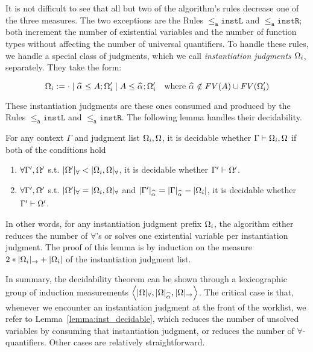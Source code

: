It is not difficult to see that all but two of the algorithm's rules decrease
one of the three measures. The two exceptions are the Rules $\mathtt{{\le_a}instL}$ and $\mathtt{{\le_a}instR}$; both increment the number of existential
variables and the number of function types without affecting the number of
universal quantifiers.
To handle these rules, we handle a special class of judgments, which
we call \emph{instantiation judgments} $\exps_i$, separately. They 
take the form:
\begin{definition}[$\exps_i$]
$$\exps_i := \cdot \mid \jcons{\al\le A}{\exps_i'} \mid \jcons{A\le \al}{\exps_i'}
\quad\text{where } \al\notin FV(A)\cup FV(\exps_i')$$
\end{definition}
These instantiation judgments are these ones consumed and
produced by the Rules $\mathtt{{\le_a}instL}$ and $\mathtt{{\le_a}instR}$.
The following lemma handles their decidability.
\begin{lemma}
	For any context $\Gamma$ and judgment list $\Omega_i, \Omega$, it is decidable whether $\Gamma\vdash \Omega_i,\Omega$ if both of the conditions hold
\begin{enumerate}[1)]
	\item $\forall \Gamma', \Omega'$ s.t. $|\Omega'|_\forall < |\Omega_i,\Omega|_\forall$, it is decidable whether $\Gamma'\vdash \Omega'$.
	\item $\forall \Gamma', \Omega'$ s.t. $|\Omega'|_\forall = |\Omega_i,\Omega|_\forall$ and $|\Gamma'|_{\al} = |\Gamma|_{\al} - |\exps_i|$, it is decidable whether $\Gamma'\vdash \Omega'$.
\end{enumerate}
\label{lemma:inst_decidable}
\end{lemma}
In other words, for any instantiation judgment prefix $\exps_i$, the algorithm
either reduces the number of $\forall$'s or solves one existential variable per
instantiation judgment. The proof of this lemma is by induction on the measure
$2*|\Omega_i|_{\to} + |\Omega_i|$ of the instantiation judgment list.

In summary, the decidability theorem can be shown through a lexicographic group
of induction measurements $\left\langle|\Omega|_\forall, |\Omega|_{\al},
|\Omega|_\to\right\rangle$. The critical case is that, whenever we
encounter an instantiation judgment at the front of the worklist, we refer to
Lemma~\ref{lemma:inst_decidable}, which reduces the number of unsolved
variables by consuming that instantiation judgment, or reduces the number of
$\forall$-quantifiers. Other cases are relatively straightforward.
